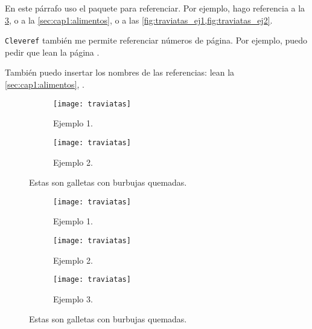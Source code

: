 En este párrafo uso el paquete  para referenciar. Por ejemplo, hago referencia a la \cref{fig:traviatas}, o a la \cref{sec:cap1:alimentos}, o a las \cref{fig:traviatas_ej1,fig:traviatas_ej2}.

\texttt{Cleveref} también me permite referenciar números de página. Por ejemplo, puedo pedir que lean la página \pageref{sec:cap1:alimentos}.

También puedo insertar los nombres de las referencias: lean la \cref{sec:cap1:alimentos}, .




\begin{figure}
    \centering
    \begin{subfigure}[b]{0.4\linewidth}
        \texttt{[image: traviatas]}
        \caption[Traviatas]{Ejemplo 1.}
        \label{fig:traviatas_ej1}    
    \end{subfigure}
    \hfill %
    \begin{subfigure}[b]{0.4\linewidth}
        \texttt{[image: traviatas]}
        \caption[Traviatas]{Ejemplo 2.}
        \label{fig:traviatas_ej2}    
    \end{subfigure}
    \caption[Traviatas]{Estas son galletas  con burbujas quemadas.}
    \label{fig:traviatas}    
\end{figure}




\begin{figure}
    \centering
    \begin{subfigure}[b]{0.3\linewidth}
        \texttt{[image: traviatas]}
        \caption[Traviatas]{Ejemplo 1.}  
    \end{subfigure}
    \hfill %
    \begin{subfigure}[b]{0.3\linewidth}
        \texttt{[image: traviatas]}
        \caption[Traviatas]{Ejemplo 2.} 
    \end{subfigure}
    \hfill %
    \begin{subfigure}[b]{0.3\linewidth}
        \texttt{[image: traviatas]}
        \caption[Traviatas]{Ejemplo 3.} 
    \end{subfigure}
    \caption[Traviatas]{Estas son galletas  con burbujas quemadas.}
    \label{fig:3traviatas}    
\end{figure}




